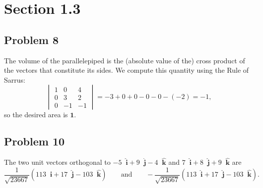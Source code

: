 \documentclass[11pt]{article}
\newcommand{\uvec}[1]{\mathop{} \!\hat{\mathbf{#1}}}
\begin{document}

\section{Section 1.3}

\subsection*{Problem 8}

The volume of the parallelepiped is the (absolute value of the) cross product of the vectors that constitute its sides. We compute this quantity using the Rule of Sarrus:
\[
	\begin{vmatrix} 1 & 0 & 4 \\ 0 & 3 & 2 \\ 0 & -1 & -1 \end{vmatrix} = -3 + 0 + 0 - 0 - 0 - (-2) = -1,
\]
so the desired area is $\mathbf{1}$.

\subsection*{Problem 10}

The two unit vectors orthogonal to $-5 \uvec{i} + 9 \uvec{j} - 4 \uvec{k}$ and $7 \uvec{i} + 8 \uvec{j} + 9 \uvec{k}$ are
\[
	\frac{1}{\sqrt{23667}} \left( 113 \uvec{i} + 17 \uvec{j} - 103 \uvec{k} \right) \qquad \text{and} \qquad - \frac{1}{\sqrt{23667}} \left( 113 \uvec{i} + 17 \uvec{j} - 103 \uvec{k} \right).
\]
\end{document}
